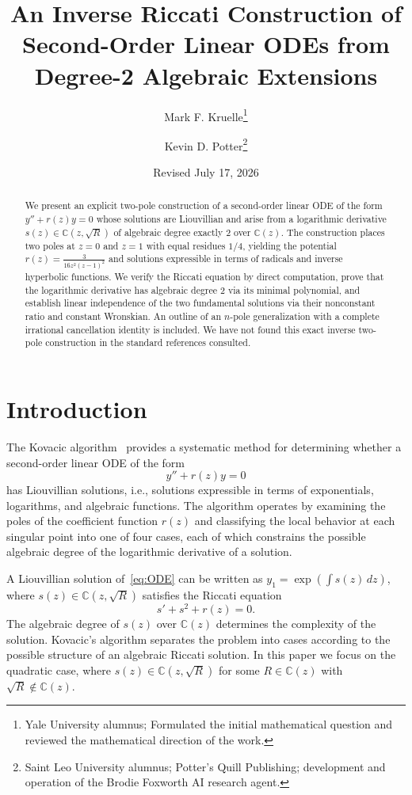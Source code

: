 \documentclass[11pt,a4paper]{article}
\title{An Inverse Riccati Construction of Second-Order Linear ODEs from Degree-2 Algebraic Extensions}
\author{Mark F. Kruelle\footnote{Yale University alumnus; Formulated the initial mathematical question and reviewed the mathematical direction of the work.} \and Kevin D. Potter\footnote{Saint Leo University alumnus; Potter's Quill Publishing; development and operation of the Brodie Foxworth AI research agent.}}
\date{Revised July 17, 2026}
\theoremstyle{definition}
\begin{document}
\maketitle

\begin{abstract}
We present an explicit two-pole construction of a second-order linear ODE of the form \(y'' + r(z)y = 0\) whose solutions are Liouvillian and arise from a logarithmic derivative \(s(z) \in \mathbb{C}(z, \sqrt{R})\) of algebraic degree exactly 2 over \(\mathbb{C}(z)\). The construction places two poles at \(z=0\) and \(z=1\) with equal residues \(1/4\), yielding the potential \(r(z) = \frac{3}{16z^2(z-1)^2}\) and solutions expressible in terms of radicals and inverse hyperbolic functions. We verify the Riccati equation by direct computation, prove that the logarithmic derivative has algebraic degree 2 via its minimal polynomial, and establish linear independence of the two fundamental solutions via their nonconstant ratio and constant Wronskian. An outline of an \(n\)-pole generalization with a complete irrational cancellation identity is included. We have not found this exact inverse two-pole construction in the standard references consulted.
\end{abstract}

\section{Introduction}

The Kovacic algorithm~\cite{kovacic1986} provides a systematic method for determining whether a second-order linear ODE of the form
\begin{equation}
y'' + r(z)y = 0
\label{eq:ODE}
\end{equation}
has Liouvillian solutions, i.e., solutions expressible in terms of exponentials, logarithms, and algebraic functions. The algorithm operates by examining the poles of the coefficient function \(r(z)\) and classifying the local behavior at each singular point into one of four cases, each of which constrains the possible algebraic degree of the logarithmic derivative of a solution.

A Liouvillian solution of~\eqref{eq:ODE} can be written as \(y_1 = \exp(\int s(z)\,dz)\), where \(s(z) \in \mathbb{C}(z, \sqrt{R})\) satisfies the Riccati equation
\begin{equation}
s' + s^2 + r(z) = 0.
\end{equation}
The algebraic degree of \(s(z)\) over \(\mathbb{C}(z)\) determines the complexity of the solution. Kovacic's algorithm separates the problem into cases according to the possible structure of an algebraic Riccati solution. In this paper we focus on the quadratic case, where \(s(z) \in \mathbb{C}(z, \sqrt{R})\) for some \(R \in \mathbb{C}(z)\) with \(\sqrt{R} \notin \mathbb{C}(z)\).
\end{document}
